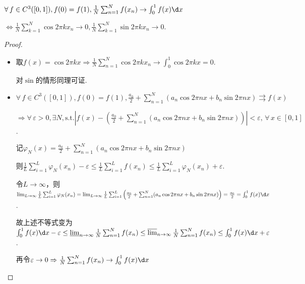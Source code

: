 \begin{theorem}
    $\forall\, f \in C^3([0,1]), f(0)=f(1),\frac{1}{N}\sum_{n=1}^N{f(x_n)}\to \int_{0}^{1}{f(x)}\d x$\par
    $\Leftrightarrow \frac{1}{N}\sum_{k=1}^N{\cos{2\pi kx_n}}\to 0,\frac{1}{N}\sum_{k=1}^N{\sin{2\pi kx_n}}\to 0$.\par
\end{theorem}
\begin{proof}
    \begin{itemize}
        \item[“$\Rightarrow$”] 取$f(x)=\cos{2\pi kx} \Rightarrow \frac{1}{N}\sum_{n=1}^N{\cos{2\pi kx_n}} \to \int_0^1{\cos{2\pi kx}} = 0$.\par
        对$\sin$的情形同理可证.
        \item[“$\Leftarrow$”] $\forall\, f \in C^3([0,1]),f(0)=f(1),\frac{a_0}{2}+\sum_{n=1}^N(a_n\cos{2\pi nx}+b_n\sin{2\pi nx})\rightrightarrows f(x)$\par
        $\Rightarrow \forall\, \varepsilon>0,\exists N,\text{s.t.}\left\lvert f(x) - \left(\frac{a_0}{2}+\sum_{n=1}^N(a_n\cos{2\pi nx}+b_n\sin{2\pi nx})\right)\right\rvert < \varepsilon,\,\forall\, x\in [0,1]$.\par
        记$\varphi_N(x) = \frac{a_0}{2}+\sum_{n=1}^N(a_n\cos{2\pi nx}+b_n\sin{2\pi nx})$\par
        则$\frac{1}{L}\sum_{i=1}^L{\varphi_N(x_n)} - \varepsilon \leq \frac{1}{L}\sum_{i=1}^L{f(x_n)} \leq \frac{1}{L}\sum_{i=1}^L{\varphi_N(x_n)} + \varepsilon$.\par
        令$L\to\infty$，则$\lim_{L\to\infty}\frac{1}{L}\sum_{i=1}^L{\varphi_N(x_n)}=\lim_{L\to\infty}{\frac{1}{L}\sum_{i=1}^L{\left(\frac{a_0}{2}+\sum_{n=1}^N(a_n\cos{2\pi nx}+b_n\sin{2\pi nx})\right)}}=\frac{a_0}{2}=\int_0^1{f(x)}\d x$.\par
        故上述不等式变为$\int_0^1{f(x)}\d x-\varepsilon \leq \varliminf_{n\to\infty}{\frac{1}{N}\sum_{n=1}^N{f(x_n)}} \leq \varlimsup_{n\to\infty}{\frac{1}{N}\sum_{n=1}^N{f(x_n)}} \leq \int_0^1{f(x)}\d x+\varepsilon$.\par
        再令$\varepsilon\to 0 \Rightarrow \frac{1}{N}\sum_{n=1}^N{f(x_n)}\to \int_{0}^{1}{f(x)}\d x$
    \end{itemize}
\end{proof}\par\noindent

